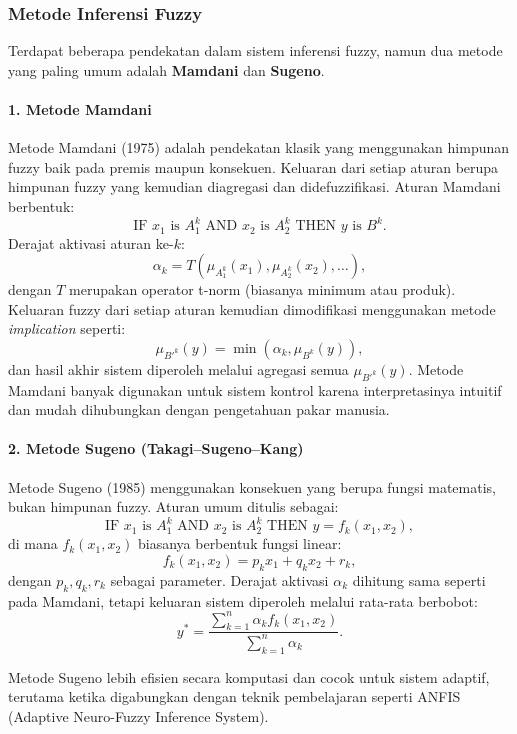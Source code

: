 \documentclass[12pt,a4paper]{article}
\theoremstyle{remark}
\begin{document}
\subsubsection{Metode Inferensi Fuzzy}

Terdapat beberapa pendekatan dalam sistem inferensi fuzzy, namun dua metode yang paling umum adalah \textbf{Mamdani} dan \textbf{Sugeno}.

\paragraph{1. Metode Mamdani}
Metode Mamdani (1975) adalah pendekatan klasik yang menggunakan himpunan fuzzy baik pada premis maupun konsekuen. Keluaran dari setiap aturan berupa himpunan fuzzy yang kemudian diagregasi dan didefuzzifikasi.
Aturan Mamdani berbentuk:
\[
    \text{IF } x_1 \text{ is } A_1^k \text{ AND } x_2 \text{ is } A_2^k \text{ THEN } y \text{ is } B^k.
\]
Derajat aktivasi aturan ke-\(k\):
\[
    \alpha_k = T(\mu_{A_1^k}(x_1), \mu_{A_2^k}(x_2), \dots),
\]
dengan \(T\) merupakan operator t-norm (biasanya minimum atau produk).
Keluaran fuzzy dari setiap aturan kemudian dimodifikasi menggunakan metode \textit{implication} seperti:
\[
    \mu_{B'^k}(y) = \min(\alpha_k, \mu_{B^k}(y)),
\]
dan hasil akhir sistem diperoleh melalui agregasi semua \(\mu_{B'^k}(y)\).
Metode Mamdani banyak digunakan untuk sistem kontrol karena interpretasinya intuitif dan mudah dihubungkan dengan pengetahuan pakar manusia.

\paragraph{2. Metode Sugeno (Takagi–Sugeno–Kang)}
Metode Sugeno (1985) menggunakan konsekuen yang berupa fungsi matematis, bukan himpunan fuzzy. Aturan umum ditulis sebagai:
\[
    \text{IF } x_1 \text{ is } A_1^k \text{ AND } x_2 \text{ is } A_2^k \text{ THEN } y = f_k(x_1, x_2),
\]
di mana \(f_k(x_1, x_2)\) biasanya berbentuk fungsi linear:
\[
    f_k(x_1, x_2) = p_k x_1 + q_k x_2 + r_k,
\]
dengan \(p_k, q_k, r_k\) sebagai parameter.
Derajat aktivasi \(\alpha_k\) dihitung sama seperti pada Mamdani, tetapi keluaran sistem diperoleh melalui rata-rata berbobot:
\begin{equation}
    y^* = \frac{\sum_{k=1}^n \alpha_k f_k(x_1, x_2)}{\sum_{k=1}^n \alpha_k}.
    \label{eq:defuzzifikasi_sugeno}
\end{equation}


Metode Sugeno lebih efisien secara komputasi dan cocok untuk sistem adaptif, terutama ketika digabungkan dengan teknik pembelajaran seperti ANFIS (Adaptive Neuro-Fuzzy Inference System).
\end{document}

